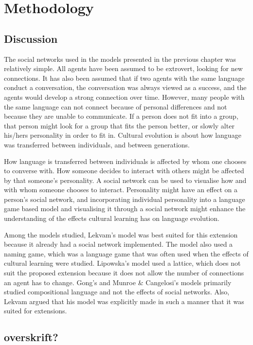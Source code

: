 \acresetall
\chapter{Methodology}\label{ch:Methodology}

\section{Discussion}
The social networks used in the models presented in the previous chapter was relatively simple. All agents have been assumed to be extrovert, looking for new connections. It has also been assumed that if two agents with the same language conduct a conversation, the conversation was always viewed as a success, and the agents would develop a strong connection over time. However, many people with the same language can not connect because of personal differences and not because they are unable to communicate. If a person does not fit into a group, that person might look for a group that fits the person better, or slowly alter his/hers personality in order to fit in. Cultural evolution is about how language was transferred between individuals, and between generations. 

How language is transferred between individuals is affected by whom one chooses to converse with. How someone decides to interact with others might be affected by that someone’s personality. A social network can be used to visualise how and with whom someone chooses to interact. Personality might have an effect on a person’s social network, and incorporating individual personality into a language game based model and visualising it through a social network might enhance the understanding of the effects cultural learning has on language evolution. 

Among the models studied, Lekvam’s model was best suited for this extension because it already had a social network implemented. The model also used a naming game, which was a language game that was often used when the effects of cultural learning were studied. Lipowska’s model used a lattice, which does not suit the proposed extension because it does not allow the number of connections an agent has to change. Gong’s and Munroe \& Cangelosi’s models primarily studied compositional language and not the effects of social networks. Also, Lekvam argued that his model was explicitly made in such a manner that it was suited for extensions.

\section{overskrift?}

